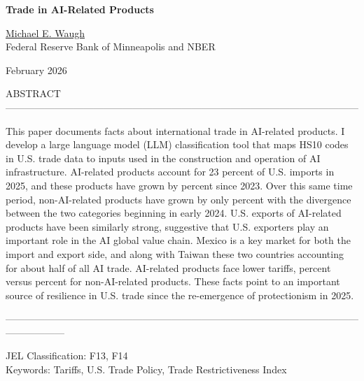 \documentclass[12pt,pdftex]{article}
\begin{document}
\begin{onehalfspacing}

{\large \textbf{Trade in AI-Related Products}}

\vspace{0.5cm}

\href{http://www.waugheconomics.com/}{Michael E. Waugh} \\ Federal Reserve Bank of Minneapolis and NBER

\vspace{0.5cm}

February 2026

\vspace{0.5cm}



\vspace{1.5cm}


\normalsize

ABSTRACT ------------------------------------------------------------------------------------------------------------

This paper documents facts about international trade in AI-related products. I develop a large language model (LLM) classification tool that maps HS10 codes in U.S. trade data to inputs used in the construction and operation of AI infrastructure. AI-related products account for 23 percent of U.S. imports in 2025, and these products have grown by \highAiPctChange{} percent since 2023. Over this same time period, non-AI-related products have grown by only \lowAiPctChange{} percent with the divergence between the two categories beginning in early 2024. U.S. exports of AI-related products have been similarly strong, suggestive that U.S. exporters play an important role in the AI global value chain. Mexico is a key market for both the import and export side, and along with Taiwan these two countries accounting for about half of all AI trade. AI-related products face lower tariffs, \tariffHighTwentyFive{} percent versus \tariffLowTwentyFive{} percent for non-AI-related products. These facts point to an important source of resilience in U.S. trade since the re-emergence of protectionism in 2025. 

------------------------------------------------------------------------------------------------------------------------------
\vspace{0.25cm}

JEL Classification: F13, F14\\
Keywords: Tariffs, U.S. Trade Policy, Trade Restrictiveness Index


\end{onehalfspacing}
\end{document}
